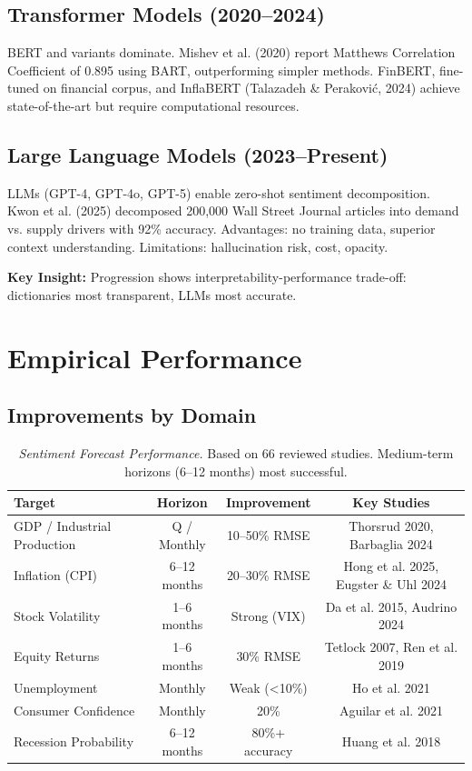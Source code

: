 \documentclass[11pt,twocolumn]{article}
\begin{document}
\subsection{Transformer Models (2020--2024)}

BERT and variants dominate. Mishev et al. (2020) report Matthews Correlation Coefficient of 0.895 using BART, outperforming simpler methods. FinBERT, fine-tuned on financial corpus, and InflaBERT (Talazadeh \& Peraković, 2024) achieve state-of-the-art but require computational resources.

\subsection{Large Language Models (2023--Present)}

LLMs (GPT-4, GPT-4o, GPT-5) enable zero-shot sentiment decomposition. Kwon et al. (2025) decomposed 200,000 Wall Street Journal articles into demand vs. supply drivers with 92\% accuracy. Advantages: no training data, superior context understanding. Limitations: hallucination risk, cost, opacity.

\textbf{Key Insight:} Progression shows interpretability-performance trade-off: dictionaries most transparent, LLMs most accurate.

\section{Empirical Performance}

\subsection{Improvements by Domain}

\begin{table}[t]
\centering \small
\begin{tabular}{lccc}
\toprule
\textbf{Target} & \textbf{Horizon} & \textbf{Improvement} & \textbf{Key Studies} \\
\midrule
GDP / Industrial Production & Q / Monthly & 10--50\% RMSE & Thorsrud 2020, Barbaglia 2024 \\
Inflation (CPI) & 6--12 months & 20--30\% RMSE & Hong et al. 2025, Eugster \& Uhl 2024 \\
Stock Volatility & 1--6 months & Strong (VIX) & Da et al. 2015, Audrino 2024 \\
Equity Returns & 1--6 months & 30\% RMSE & Tetlock 2007, Ren et al. 2019 \\
Unemployment & Monthly & Weak (<10\%) & Ho et al. 2021 \\
Consumer Confidence & Monthly & 20\% & Aguilar et al. 2021 \\
Recession Probability & 6--12 months & 80\%+ accuracy & Huang et al. 2018 \\
\bottomrule
\end{tabular}
\caption{\textit{Sentiment Forecast Performance.} Based on 66 reviewed studies. Medium-term horizons (6--12 months) most successful.}
\label{tab:perf}
\end{table}
\end{document}
